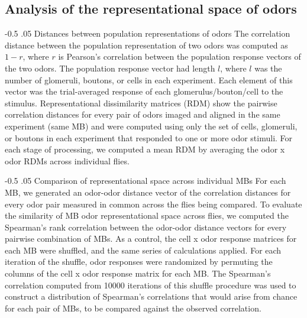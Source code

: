 \documentclass[12pt]{caltech_thesis}
\makeatletter
\let\Oldsubsection\subsection
\renewcommand{\subsection}{\FloatBarrier\Oldsubsection}
\let\Oldsubsubsection\subsubsection
\renewcommand{\subsubsection}{\FloatBarrier\Oldsubsubsection}
\renewcommand\subsubsection{%
    \@startsection{subsubsection}{4}{0mm}%
       {-0.5\baselineskip}%
       {.05\baselineskip}%
       {\normalfont\normalsize\bfseries\itshape}}
\makeatother
\begin{document}
\begin{refsection}
\subsection{Analysis of the representational space of odors}
\subsubsection{Distances between population representations of odors}
The correlation distance between the population representation of two odors was computed as $1-r$, where $r$ is Pearson's correlation between the population response vectors of the two odors.
The population response vector had length $l$, where $l$ was the number of glomeruli, boutons, or cells in each experiment.
Each element of this vector was the trial-averaged response of each glomerulus/bouton/cell to the stimulus.
Representational dissimilarity matrices (RDM) show the pairwise correlation distances for every pair of odors imaged and aligned in the same experiment (same MB) and were computed using only the set of cells, glomeruli, or boutons in each experiment that responded to one or more odor stimuli.
For each stage of processing, we computed a mean RDM by averaging the odor x odor RDMs across individual flies.

\subsubsection{Comparison of representational space across individual MBs}
For each MB, we generated an odor-odor distance vector of the correlation distances for every odor pair measured in common across the flies being compared.
To evaluate the similarity of MB odor representational space across flies, we computed the Spearman's rank correlation between the odor-odor distance vectors for every pairwise combination of MBs.
As a control, the cell x odor response matrices for each MB were shuffled, and the same series of calculations applied.
For each iteration of the shuffle, odor responses were randomized by permuting the columns of the cell x odor response matrix for each MB.
The Spearman's correlation computed from \num{10000} iterations of this shuffle procedure was used to construct a distribution of Spearman's correlations that would arise from chance for each pair of MBs, to be compared against the observed correlation.


\end{refsection}
\end{document}
